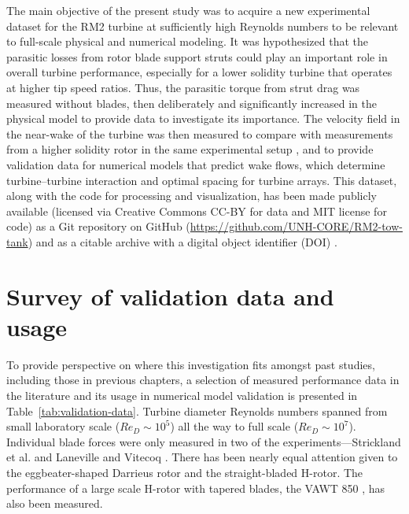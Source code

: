 The main objective of the present study was to acquire a new experimental
dataset for the RM2 turbine at sufficiently high Reynolds numbers to be relevant
to full-scale physical and numerical modeling. It was hypothesized that the
parasitic losses from rotor blade support struts could play an important role in
overall turbine performance, especially for a lower solidity turbine that
operates at higher tip speed ratios. Thus, the parasitic torque from strut drag
was measured without blades, then deliberately and significantly increased in
the physical model to provide data to investigate its importance. The velocity
field in the near-wake of the turbine was then measured to compare with
measurements from a higher solidity rotor in the same experimental setup
\cite{Bachant2015-JoT}, and to provide validation data for numerical models that
predict wake flows, which determine turbine--turbine interaction and optimal
spacing for turbine arrays. This dataset, along with the code for processing and
visualization, has been made publicly available (licensed via Creative Commons
CC-BY for data and MIT license for code) as a Git repository on GitHub
(\url{https://github.com/UNH-CORE/RM2-tow-tank}) and as a citable archive with a
digital object identifier (DOI) \cite{Bachant2016-RM2-data}.


\section{Survey of validation data and usage}

To provide perspective on where this investigation fits amongst past studies,
including those in previous chapters, a selection of measured performance data
in the literature and its usage in numerical model validation is presented in
Table~\ref{tab:validation-data}. Turbine diameter Reynolds numbers spanned from
small laboratory scale ($Re_D \sim 10^5$) all the way to full scale ($Re_D \sim
10^7$). Individual blade forces were only measured in two of the
experiments---Strickland et al. \cite{Strickland1981} and Laneville and Vitecoq
\cite{Laneville1986}. There has been nearly equal attention given to the
eggbeater-shaped Darrieus rotor and the straight-bladed H-rotor. The performance
of a large scale H-rotor with tapered blades, the VAWT 850 \cite{Mays1990}, has
also been measured.

